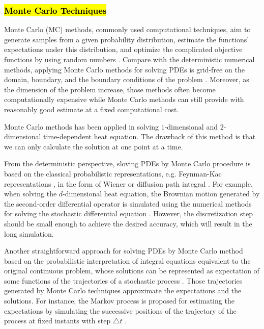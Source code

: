 \subsubsection{\textcolor{red}{\textbf{\hl{Monte Carlo Techniques}}}}


Monte Carlo (MC) methods, commonly used computational techniques, aim
to generate samples from a given probability distribution, estimate
the functions' expectations under this distribution, and optimize the
complicated objective functions by using random numbers
\cite{kroese2014monte}. Compare with the deterministic numerical
methods, applying Monte Carlo methods for solving PDEs is grid-free on
the domain, boundary, and the boundary conditions of the problem
\cite{grebenkov2014efficient}. Moreover, as the dimension of the
problem increase, those methods often become computationally expensive
while Monte Carlo methods can still provide with reasonably good
estimate at a fixed computational cost. 

Monte Carlo methods has been applied in solving $1$-dimensional and
$2$-dimensional time-dependent heat equation. The drawback of this
method is that we can only calculate the solution at one point at a
time. 

From the deterministic perspective, sloving PDEs by Monte Carlo
procedure is based on the classical probabilistic representations,
e.g. Feynman-Kac representations \cite{kac1987enigmas}, in the form of
Wiener or diffusion path integral \cite{sabelfeld2013random}. For
example, when solving the $d$-dimensional heat equation, the Brownian
motion generated by the second-order differential operator is
simulated using the numerical methods for solving the stochastic
differential equation \cite{wiki:MCMheat}. However, the discretization
step should be small enough to achieve the desired accuracy, which
will result in the long simulation.

Another straightforward approach for solving PDEs by Monte Carlo
method based on the probabilistic interpretation of integral equations
equivalent to the original continuous problem, whose solutions can be
represented as expectation of some functions of the trajectories of a
stochastic process
\cite{varadhan1980lectures}\cite{grebenkov2014efficient}\cite{sabelfeld2013random}.
Those trajectories generated by Monte Carlo techniques approximate the
expectations and the solutions. For instance, the Markov process is
proposed for estimating the expectations by simulating the successive
positions of the trajectory of the process at fixed instants with step
$\triangle t$ \cite{kronberg1976solution}\cite{king1951monte}.

